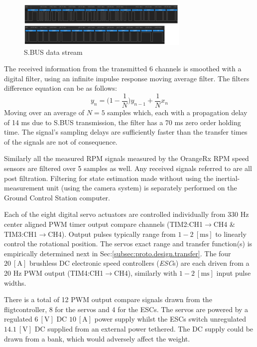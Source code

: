 \begin{figure}[hbtp]
\centering
\includegraphics[width=\textwidth]{figs/sbus}
\caption{S.BUS data stream}
\label{fig:sbus}
\vspace{-10pt}
\end{figure}
\par
{\color{red}
The received information from the transmitted 6 channels is smoothed with a digital filter, using an infinite impulse response moving average filter. The filters difference equation can be as follows: 
\begin{equation}
y_n = \big(1-\frac{1}{N}\big)y_{n-1}+\frac{1}{N}x_n
\end{equation}
Moving over an average of $N=5$ samples which, each with a propagation delay of 14 ms due to S.BUS transmission, the filter has a 70 ms zero order holding time. The signal's sampling delays are sufficiently faster than the transfer times of the signals are not of consequence. 
\par
Similarly all the measured RPM signals measured by the OrangeRx RPM speed sensors are filtered over 5 samples as well. Any received signals referred to are all post filtration. Filtering for state estimation made without using the inertial-measurement unit (using the camera system) is separately performed on the Ground Control Station computer.}
\par
Each of the eight digital servo actuators are controlled individually from 330 Hz center aligned PWM timer output compare channels (TIM2:CH1$\rightarrow$CH4 \& TIM3:CH1$\rightarrow$CH4). Output pulses typically range from $1-2~[\text{ms}]$ to linearly control the rotational position. The servos exact range and transfer function(s) is empirically determined next in Sec:\ref{subsec:proto.design.transfer}. The four $20~[\text{A}]$ brushless DC electronic speed controllers (\emph{ESC}s) are each driven from a 20 Hz PWM output (TIM4:CH1$\rightarrow$CH4), similarly with $1-2~[\text{ms}]$ input pulse widths. 
\par
There is a total of 12 PWM output compare signals drawn from the fligtcontroller, 8 for the servos and 4 for the ESCs. The servos are powered by a regulated $6~[\text{V}]$ DC $10~[\text{A}]$ power supply \cite{rotorstar} whilst the ESCs switch unregulated $14.1~[\text{V}]$ DC supplied from an external power tethered. The DC supply could be drawn from a bank, which would adversely affect the weight.

